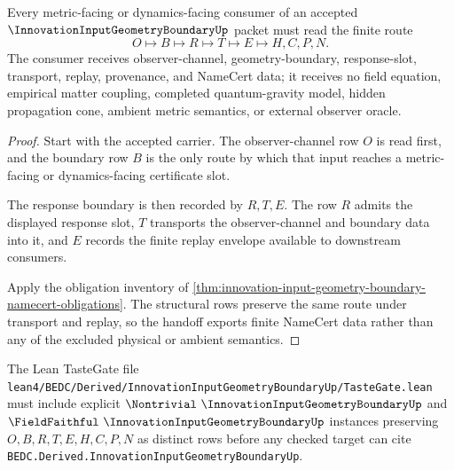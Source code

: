 \begin{theorem}
\label{thm:innovation-input-geometry-boundary-response-handoff}
Every metric-facing or dynamics-facing consumer of an accepted $\InnovationInputGeometryBoundaryUp$ packet must read the finite route
$$
O \longmapsto B \longmapsto R \longmapsto T \longmapsto E \longmapsto H,C,P,N .
$$
The consumer receives observer-channel, geometry-boundary, response-slot, transport, replay, provenance, and NameCert data; it receives no field equation, empirical matter coupling, completed quantum-gravity model, hidden propagation cone, ambient metric semantics, or external observer oracle.
\end{theorem}
\begin{proof}
Start with the accepted carrier. The observer-channel row $O$ is read first, and the boundary row $B$ is the only route by which that input reaches a metric-facing or dynamics-facing certificate slot.

The response boundary is then recorded by $R,T,E$. The row $R$ admits the displayed response slot, $T$ transports the observer-channel and boundary data into it, and $E$ records the finite replay envelope available to downstream consumers.

Apply the obligation inventory of \autoref{thm:innovation-input-geometry-boundary-namecert-obligations}. The structural rows preserve the same route under transport and replay, so the handoff exports finite NameCert data rather than any of the excluded physical or ambient semantics.
\end{proof}



The Lean TasteGate file \texttt{lean4/BEDC/Derived/InnovationInputGeometryBoundaryUp/TasteGate.lean} must include explicit $\Nontrivial\ \InnovationInputGeometryBoundaryUp$ and $\FieldFaithful\ \InnovationInputGeometryBoundaryUp$ instances preserving $O,B,R,T,E,H,C,P,N$ as distinct rows before any checked target can cite \texttt{BEDC.Derived.InnovationInputGeometryBoundaryUp}.

